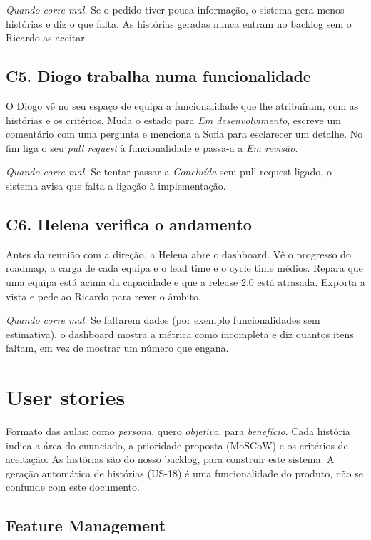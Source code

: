 \documentclass[12pt,a4paper]{article}
\begin{document}
\textit{Quando corre mal.} Se o pedido tiver pouca informação, o sistema gera menos histórias e diz o que falta. As histórias geradas nunca entram no backlog sem o Ricardo as aceitar.

\subsection{C5. Diogo trabalha numa funcionalidade}
O Diogo vê no seu espaço de equipa a funcionalidade que lhe atribuíram, com as histórias e os critérios. Muda o estado para \textit{Em desenvolvimento}, escreve um comentário com uma pergunta e menciona a Sofia para esclarecer um detalhe. No fim liga o seu \textit{pull request} à funcionalidade e passa-a a \textit{Em revisão}.

\textit{Quando corre mal.} Se tentar passar a \textit{Concluída} sem pull request ligado, o sistema avisa que falta a ligação à implementação.

\subsection{C6. Helena verifica o andamento}
Antes da reunião com a direção, a Helena abre o dashboard. Vê o progresso do roadmap, a carga de cada equipa e o lead time e o cycle time médios. Repara que uma equipa está acima da capacidade e que a release 2.0 está atrasada. Exporta a vista e pede ao Ricardo para rever o âmbito.

\textit{Quando corre mal.} Se faltarem dados (por exemplo funcionalidades sem estimativa), o dashboard mostra a métrica como incompleta e diz quantos itens faltam, em vez de mostrar um número que engana.

\section{User stories}

Formato das aulas: como \textit{persona}, quero \textit{objetivo}, para \textit{benefício}. Cada história indica a área do enunciado, a prioridade proposta (MoSCoW) e os critérios de aceitação. As histórias são do nosso backlog, para construir este sistema. A geração automática de histórias (US-18) é uma funcionalidade do produto, não se confunde com este documento.

\subsection{Feature Management}
\end{document}
